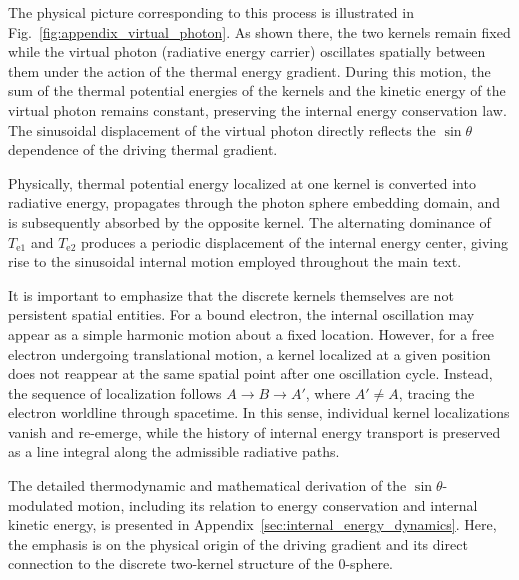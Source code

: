 \documentclass[%
 reprint,
 amsmath,amssymb,
 aps,
 prb,
]{revtex4-2}
\numberwithin{equation}{section}
\begin{document}
The physical picture corresponding to this process is illustrated in Fig.~\ref{fig:appendix_virtual_photon}.
As shown there, the two kernels remain fixed while the virtual photon (radiative energy carrier) oscillates spatially between them under the action of the thermal energy gradient.
During this motion, the sum of the thermal potential energies of the kernels and the kinetic energy of the virtual photon remains constant, preserving the internal energy conservation law.
The sinusoidal displacement of the virtual photon directly reflects the $\sin\theta$ dependence of the driving thermal gradient.

Physically, thermal potential energy localized at one kernel is converted into radiative energy, propagates through the photon sphere embedding domain, and is subsequently absorbed by the opposite kernel.
The alternating dominance of $T_{\mathrm{e1}}$ and $T_{\mathrm{e2}}$ produces a periodic displacement of the internal energy center, giving rise to the sinusoidal internal motion employed throughout the main text.

It is important to emphasize that the discrete kernels themselves are not persistent spatial entities.
For a bound electron, the internal oscillation may appear as a simple harmonic motion about a fixed location.
However, for a free electron undergoing translational motion, a kernel localized at a given position does not reappear at the same spatial point after one oscillation cycle.
Instead, the sequence of localization follows $A \rightarrow B \rightarrow A'$, where $A' \neq A$, tracing the electron worldline through spacetime.
In this sense, individual kernel localizations vanish and re-emerge, while the history of internal energy transport is preserved as a line integral along the admissible radiative paths.


The detailed thermodynamic and mathematical derivation of the $\sin\theta$-modulated motion, including its relation to energy conservation and internal kinetic energy, is presented in Appendix~\ref{sec:internal_energy_dynamics}.
Here, the emphasis is on the physical origin of the driving gradient and its direct connection to the discrete two-kernel structure of the 0-sphere.
\end{document}
